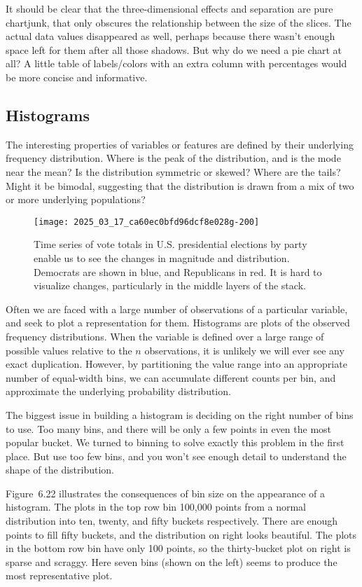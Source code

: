 \documentclass[10pt]{article}
\begin{document}
It should be clear that the three-dimensional effects and separation are pure chartjunk, that only obscures the relationship between the size of the slices. The actual data values disappeared as well, perhaps because there wasn't enough space left for them after all those shadows. But why do we need a pie chart at all? A little table of labels/colors with an extra column with percentages would be more concise and informative.

\subsection{Histograms}

The interesting properties of variables or features are defined by their underlying frequency distribution. Where is the peak of the distribution, and is the mode near the mean? Is the distribution symmetric or skewed? Where are the tails? Might it be bimodal, suggesting that the distribution is drawn from a mix of two or more underlying populations?

\begin{figure}[h]
\centering
\texttt{[image: 2025\_03\_17\_ca60ec0bfd96dcf8e028g-200]}
\caption{Time series of vote totals in U.S. presidential elections by party enable us to see the changes in magnitude and distribution. Democrats are shown in blue, and Republicans in red. It is hard to visualize changes, particularly in the middle layers of the stack.}
\end{figure}

Often we are faced with a large number of observations of a particular variable, and seek to plot a representation for them. Histograms are plots of the observed frequency distributions. When the variable is defined over a large range of possible values relative to the $n$ observations, it is unlikely we will ever see any exact duplication. However, by partitioning the value range into an appropriate number of equal-width bins, we can accumulate different counts per bin, and approximate the underlying probability distribution.

The biggest issue in building a histogram is deciding on the right number of bins to use. Too many bins, and there will be only a few points in even the most popular bucket. We turned to binning to solve exactly this problem in the first place. But use too few bins, and you won't see enough detail to understand the shape of the distribution.

Figure~6.22 illustrates the consequences of bin size on the appearance of a histogram. The plots in the top row bin 100,000 points from a normal distribution into ten, twenty, and fifty buckets respectively. There are enough points to fill fifty buckets, and the distribution on right looks beautiful. The plots in the bottom row bin have only 100 points, so the thirty-bucket plot on right is sparse and scraggy. Here seven bins (shown on the left) seems to produce the most representative plot.
\end{document}
